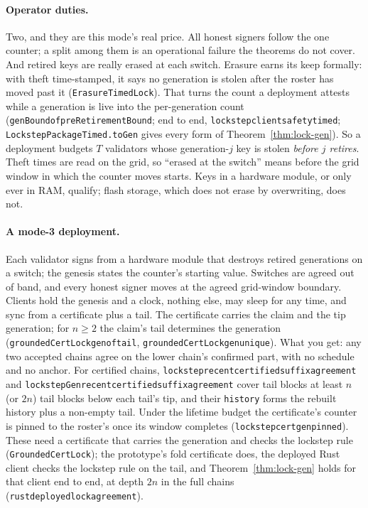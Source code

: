 \documentclass[10pt]{article}
\DeclareRobustCommand{\code}[1]{{\renewcommand{\_}{\textunderscore\allowbreak}\texttt{#1}}}
\begin{document}
\paragraph{Operator duties.} Two, and they are this mode's real price.
All honest signers follow the one counter; a split among them is an
operational failure the theorems do not cover. And retired keys are
really erased at each switch. Erasure earns its keep formally: with
theft time-stamped, it says no generation is stolen after the roster has
moved past it (\code{ErasureTimedLock}). That turns the count a
deployment attests while a generation is live into the per-generation
count (\code{genBound\_of\_preRetirementBound}; end to end,
\code{lockstep\_client\_safety\_timed}; \code{LockstepPackageTimed.toGen}
gives every form of Theorem~\ref{thm:lock-gen}). So a deployment budgets
$T$ validators whose generation-$j$ key is stolen \emph{before $j$
retires}. Theft times are read on the grid, so ``erased at the switch''
means before the grid window in which the counter moves starts. Keys in a hardware module, or only ever in
RAM, qualify; flash storage, which does not erase by overwriting, does
not.

\paragraph{A mode-3 deployment.} Each validator signs from a hardware
module that destroys retired generations on a switch; the genesis states
the counter's starting value. Switches are agreed out of band, and every
honest signer moves at the agreed grid-window boundary. Clients hold the
genesis and a clock, nothing else, may sleep for any time, and sync from
a certificate plus a tail. The certificate carries the claim and the tip
generation; for $n \ge 2$ the claim's tail determines the generation
(\code{groundedCertLock\_gen\_of\_tail},
\code{groundedCertLock\_gen\_unique}). What you
get: any two accepted chains agree on the lower chain's confirmed part,
with no schedule and no anchor. For certified chains,
\code{lockstep\_recent\_certified\_suffix\_agreement} and
\code{lockstepGen\_recent\_certified\_suffix\_agreement} cover tail
blocks at least $n$ (or $2n$) tail blocks below each tail's tip, and
their \code{\_history\_} forms the rebuilt history plus a non-empty tail.
Under the lifetime budget the
certificate's counter is pinned to the roster's once its window
completes (\code{lockstep\_cert\_gen\_pinned}). These need a certificate
that carries the generation and checks the lockstep rule
(\code{GroundedCertLock}); the prototype's fold certificate does, the
deployed Rust client checks the lockstep rule on the tail, and
Theorem~\ref{thm:lock-gen} holds for that client end to end, at depth
$2n$ in the full chains (\code{rust\_deployed\_lock\_agreement}).
\end{document}
